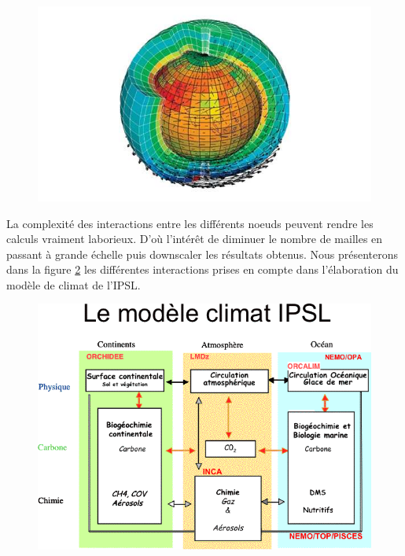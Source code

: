 \documentclass[a4paper,11pt]{article}
\numberwithin{equation}{section}
\begin{document}
\begin{figure}[H]
	\begin{center}
		\includegraphics[scale=0.4]{maillage_terre.jpg}
	\end{center}
	\label{fig-maillage multidimentionnel terre}
\end{figure}

La complexité des interactions entre les différents noeuds peuvent rendre les calculs vraiment laborieux. D'où l'intérêt de diminuer le nombre de mailles en passant à grande échelle puis downscaler les résultats obtenus. Nous présenterons dans la figure \ref{fig-modele de climat} les différentes interactions prises en compte dans l'élaboration du modèle de climat de l'IPSL.

\begin{figure}[H]
	\begin{center}
		\includegraphics[scale=0.6]{modele_climat_IPSL.png}
	\end{center}
	\label{fig-modele de climat}
\end{figure}
	
\end{document}
